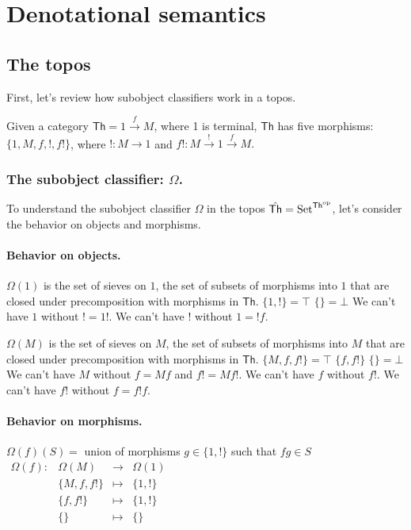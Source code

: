 \section{Denotational semantics}
\subsection{The topos}

First, let's review how subobject classifiers work in a topos. 

Given a category $\mathsf{Th} = 1 \xrightarrow{f} M$, where 1 is terminal, $\mathsf{Th}$ has five morphisms: $\{1, M, f, !, f!\}$, where $!\colon M \to 1$ and $f!\colon M \xrightarrow{!} 1 \xrightarrow{f} M.$

\subsubsection{The subobject classifier: $\Omega$.}

To understand the subobject classifier $\Omega$ in the topos $\hat{\mathsf{Th}} = {\rm Set}^{\mathsf{Th}^{\rm op}}$, let's consider the behavior on objects and morphisms.

\paragraph{Behavior on objects.}

$\Omega(1)$ is the set of sieves on $1$, the set of subsets of morphisms into $1$ that are closed under precomposition with morphisms in $\mathsf{Th}$.
$\{1, !\}= \top$
$\{\} = \bot$
We can't have $1$ without $! = 1!$.  We can't have $!$ without $1 = !f$.

$\Omega(M)$ is the set of sieves on $M$, the set of subsets of morphisms into $M$ that are closed under precomposition with morphisms in $\mathsf{Th}$.
$\{M, f, f!\} = \top$
$\{f, f!\}$
$\{\} = \bot$
We can't have $M$ without $f=Mf$ and $f!=Mf!$.  We can't have $f$ without $f!$.  We can't have $f!$ without $f = f!f$.

\paragraph{Behavior on morphisms.}

$\Omega(f)(S) =$ union of morphisms $g\in\{1, !\}$ such that $fg \in S$
$\begin{array}{rrcl}\Omega(f)\colon & \Omega(M) & \to & \Omega(1) \\ &\{M, f, f!\} & \mapsto & \{1, !\} \\ & \{f, f!\} & \mapsto & \{1, !\} \\ & \{\} & \mapsto & \{\}\end{array}$

